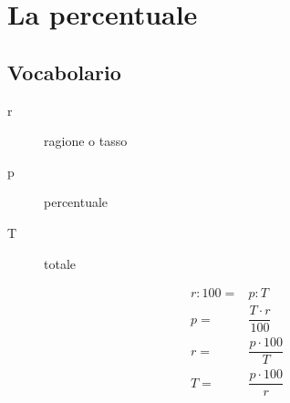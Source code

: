 \chapter{La percentuale}
\section{Vocabolario}
\begin{description}
	\item[r] ragione o tasso
	\item[p] percentuale
	\item[T] totale
\end{description}
\begin{align*}
r:100=&p:T\\
p=&\dfrac{T\cdot r}{100}\\
r=&\dfrac{p\cdot100}{T}\\
T=&\dfrac{p\cdot100}{r}\\
\end{align*}
